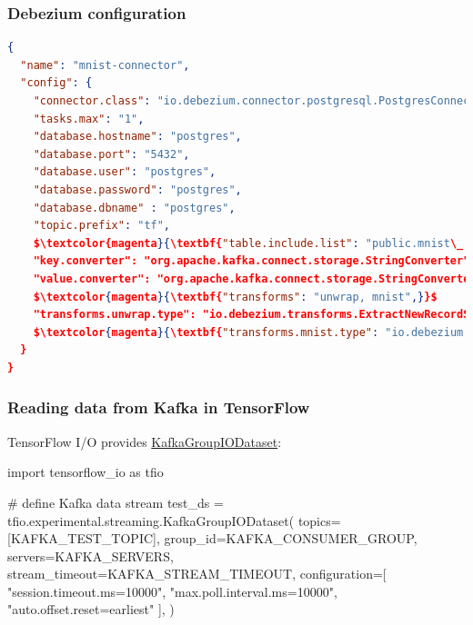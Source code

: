 \documentclass[10pt,utf8]{beamer}
\begin{document}
\begin{frame}[fragile]
    \frametitle{Debezium configuration}
    \footnotesize
    \begin{lstlisting}[language=json, mathescape=true]
{
  "name": "mnist-connector",
  "config": {
    "connector.class": "io.debezium.connector.postgresql.PostgresConnector",
    "tasks.max": "1",
    "database.hostname": "postgres",
    "database.port": "5432",
    "database.user": "postgres",
    "database.password": "postgres",
    "database.dbname" : "postgres",
    "topic.prefix": "tf",
    $\textcolor{magenta}{\textbf{"table.include.list": "public.mnist\_.*",}}$
    "key.converter": "org.apache.kafka.connect.storage.StringConverter",
    "value.converter": "org.apache.kafka.connect.storage.StringConverter",
    $\textcolor{magenta}{\textbf{"transforms": "unwrap, mnist",}}$
    "transforms.unwrap.type": "io.debezium.transforms.ExtractNewRecordState",
    $\textcolor{magenta}{\textbf{"transforms.mnist.type": "io.debezium.transforms.MnistToCsv"}}$
  }
} 
     \end{lstlisting}
\end{frame}

\begin{frame}[fragile]
    \frametitle{Reading data from Kafka in TensorFlow}
    TensorFlow I/O provides \textcolor{blue}{\href{https://www.tensorflow.org/io/api_docs/python/tfio/experimental/streaming/KafkaGroupIODataset}{KafkaGroupIODataset}}:
    
    \vspace{0.5cm}
    
    \footnotesize
    \begin{python}
import tensorflow_io as tfio
    
# define Kafka data stream
test_ds = tfio.experimental.streaming.KafkaGroupIODataset(
    topics=[KAFKA_TEST_TOPIC],
    group_id=KAFKA_CONSUMER_GROUP,
    servers=KAFKA_SERVERS,
    stream_timeout=KAFKA_STREAM_TIMEOUT,
    configuration=[
        "session.timeout.ms=10000",
        "max.poll.interval.ms=10000",
        "auto.offset.reset=earliest"
    ],
)
    \end{python}
\end{frame}
\end{document}
